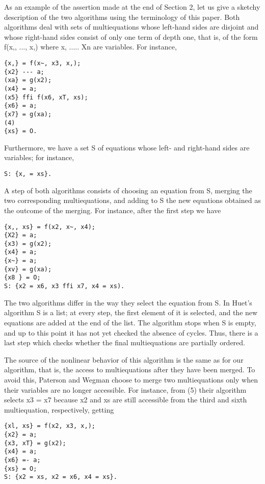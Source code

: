 As an example of the assertion made at the end of Section 2, let us give a
sketchy description of the two algorithms using the terminology of this paper.
Both algorithms deal with sets of multiequations whose left-hand sides are
disjoint and whose right-hand sides consist of only one term of depth one, that is, 
of the form f(x,, ..., x,) where x, ..... Xn are variables. For instance, 
\begin{verbatim}
{x,} = f(x~, x3, x,); 
{x2} --- a;
(xa} = g(x2);
(x4} = a;
(x5} ffi f(x6, xT, xs);
{x6} = a;
{x7} = g(xa);
(4)
{xs} = O. 
\end{verbatim}

Furthermore, we have a set S of equations whose left- and right-hand sides are 
variables; for instance, 
\begin{verbatim}
S: {x, = xs}. 
\end{verbatim}

A step of both algorithms consists of choosing an equation from S, merging the
two corresponding multiequations, and adding to S the new equations obtained
as the outcome of the merging. For instance, after the first step we have
\begin{verbatim}
{x,, xs} = f(x2, x~, x4);
{X2} = a;
{x3) = g(x2);
{x4} = a;
{x~} = a;
{xv} = g(xa);
{x8 } = O;
S: {x2 = x6, x3 ffi x7, x4 = xs). 
\end{verbatim}

The two algorithms differ in the way they select the equation from S. In Huet's
algorithm S is a list; at every step, the first element of it is selected, and the new
equations are added at the end of the list. The algorithm stops when S is empty,
and up to this point it has not yet checked the absence of cycles. Thus, there is
a last step which checks whether the final multiequations are partially ordered. 

The source of the nonlinear behavior of this algorithm is the same as for our
algorithm, that is, the access to multiequations after they have been merged. To
avoid this, Paterson and Wegman choose to merge two multiequations only when
their variables are no longer accessible. For instance, from (5) their algorithm
selects x3 = x7 because x2 and xs are still accessible from the third and sixth
multiequation, respectively, getting
\begin{verbatim}
{xl, xs} = f(x2, x3, x,);
{x2} = a;
{x3, xT} = g(x2);
{x4} = a;
{x6} =- a;
{xs} = O;
S: {x2 = xs, x2 = x6, x4 = xs}. 
\end{verbatim}

